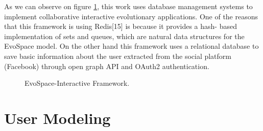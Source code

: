 As we can observe on figure \ref{fig:ESFramework}, this work uses database
management systems to implement collaborative interactive evolutionary
applications. One of the reasons that this framework is using Redis[15] is
because it provides a hash- based implementation of sets and queues, which are
natural data structures for the EvoSpace model. On the other hand this framework
uses a relational database to save basic information about the user extracted
from the social platform (Facebook) through open graph API and OAuth2
authentication.
\begin{figure}
	\captionsetup{justification=centering,margin=2cm}
	\centering
	\setlength\fboxsep{0pt}
	\setlength\fboxrule{0.7pt}
	\caption{EvoSpace-Interactive Framework.}
	\label{fig:ESFramework}
\end{figure}

\section{User Modeling}


